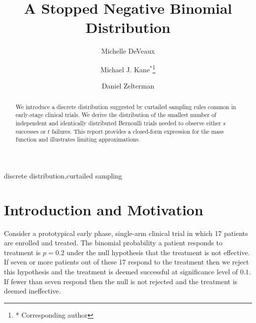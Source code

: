 \documentclass[review]{elsarticle}
\begin{document}
\begin{frontmatter}

\title{A Stopped Negative Binomial Distribution}


\author{Michelle DeVeaux}

\author{Michael J. Kane$^*$\footnote{* Corresponding author}}

\author{Daniel Zelterman}

\address{Department of Biostatistics\\ School of Epidemiology and Public Health\\ Yale University, New Haven, CT}

\begin{abstract}
We introduce a discrete distribution suggested by curtailed
sampling rules common in early-stage clinical trials. We derive the
distribution of the smallest number of independent and identically
distributed Bernoulli trials needed to observe either $s$ successes 
or $t$ failures. This report provides a closed-form expression for the 
mass function and illustrates limiting approximations.
\end{abstract}

\begin{keyword}
discrete distribution\sep curtailed sampling
\end{keyword}

\end{frontmatter}

\linenumbers

\section{Introduction and Motivation}

Consider a prototypical early phase, single-arm clinical trial in which 
17 patients
are enrolled and treated. The binomial probability a patient 
responds to treatment is $p=0.2$ 
under the null hypothesis that the treatment is not effective.
If seven or more patients out of these 17 respond to the treatment then we 
reject this hypothesis and the treatment is deemed successful at 
significance level of $0.1$.  If fewer than seven respond then the null is not 
rejected and the treatment is deemed ineffective.
\end{document}
